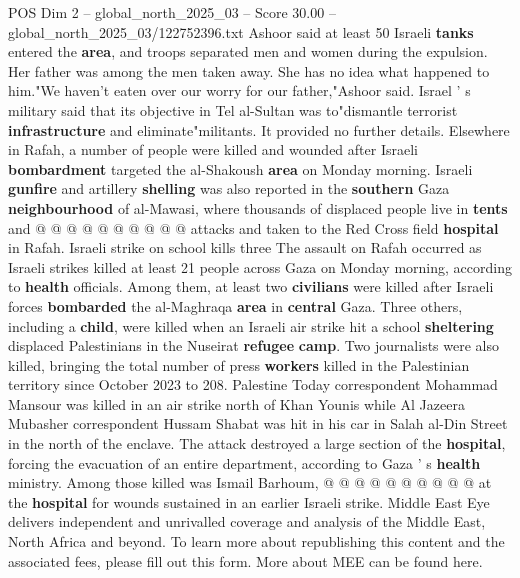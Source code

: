 \begin{textsample}{POS Dim 2 – global\_north\_2025\_03 – Score 30.00 – global\_north\_2025\_03/122752396.txt}
Ashoor said at least 50 Israeli \textbf{tanks} entered the \textbf{area}, and troops separated men and women during the expulsion.
Her father was among the men taken away.
She has no idea what happened to him."We haven't eaten over our worry for our father,"Ashoor said.
Israel ' s military said that its objective in Tel al-Sultan was to"dismantle terrorist \textbf{infrastructure} and eliminate"militants.
It provided no further details.
Elsewhere in Rafah, a number of people were killed and wounded after Israeli \textbf{bombardment} targeted the al-Shakoush \textbf{area} on Monday morning.
Israeli \textbf{gunfire} and artillery \textbf{shelling} was also reported in the \textbf{southern} Gaza \textbf{neighbourhood} of al-Mawasi, where thousands of displaced people live in \textbf{tents} and @ @ @ @ @ @ @ @ @ @ attacks and taken to the Red Cross field \textbf{hospital} in Rafah.
Israeli strike on school kills three The assault on Rafah occurred as Israeli strikes killed at least 21 people across Gaza on Monday morning, according to \textbf{health} officials.
Among them, at least two \textbf{civilians} were killed after Israeli forces \textbf{bombarded} the al-Maghraqa \textbf{area} in \textbf{central} Gaza.
Three others, including a \textbf{child}, were killed when an Israeli air strike hit a school \textbf{sheltering} displaced Palestinians in the Nuseirat \textbf{refugee} \textbf{camp}.
Two journalists were also killed, bringing the total number of press \textbf{workers} killed in the Palestinian territory since October 2023 to 208.
Palestine Today correspondent Mohammad Mansour was killed in an air strike north of Khan Younis while Al Jazeera Mubasher correspondent Hussam Shabat was hit in his car in Salah al-Din Street in the north of the enclave.
The attack destroyed a large section of the \textbf{hospital}, forcing the evacuation of an entire department, according to Gaza ' s \textbf{health} ministry.
Among those killed was Ismail Barhoum, @ @ @ @ @ @ @ @ @ @ at the \textbf{hospital} for wounds sustained in an earlier Israeli strike.
Middle East Eye delivers independent and unrivalled coverage and analysis of the Middle East, North Africa and beyond.
To learn more about republishing this content and the associated fees, please fill out this form.
More about MEE can be found here.

\end{textsample}
